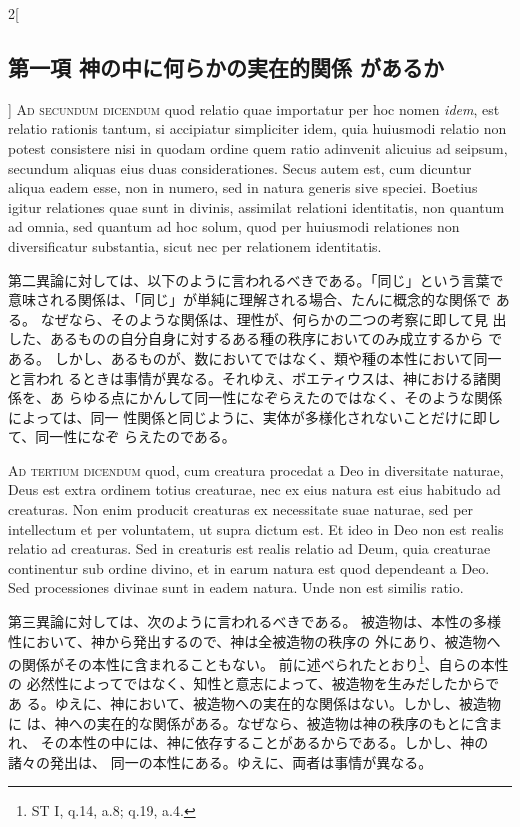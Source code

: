 \documentclass[paper=a4paper,fontsize=10pt,jafontsize=9pt,titlepage]{jlreq}
\begin{document}
\begin{paracol}{2}[\subsection{第一項 神の中に何らかの実在的関係 があるか}]
{\scshape Ad secundum dicendum} quod relatio quae importatur per hoc nomen {\itshape idem},
est relatio rationis tantum, si accipiatur simpliciter idem, quia
huiusmodi relatio non potest consistere nisi in quodam ordine quem ratio
adinvenit alicuius ad seipsum, secundum aliquas eius duas
considerationes. Secus autem est, cum dicuntur aliqua eadem esse, non in
numero, sed in natura generis sive speciei. Boetius igitur relationes
quae sunt in divinis, assimilat relationi identitatis, non quantum ad
omnia, sed quantum ad hoc solum, quod per huiusmodi relationes non
diversificatur substantia, sicut nec per relationem identitatis.


\switchcolumn


第二異論に対しては、以下のように言われるべきである。「同じ」という言葉で
 意味される関係は、「同じ」が単純に理解される場合、たんに概念的な関係で
 ある。
なぜなら、そのような関係は、理性が、何らかの二つの考察に即して見
 出した、あるものの自分自身に対するある種の秩序においてのみ成立するから
 である。
しかし、あるものが、数においてではなく、類や種の本性において同一と言われ
 るときは事情が異なる。それゆえ、ボエティウスは、神における諸関係を、あ
 らゆる点にかんして同一性になぞらえたのではなく、そのような関係によっては、同一
 性関係と同じように、実体が多様化されないことだけに即して、同一性になぞ
 らえたのである。


\switchcolumn*[\subsection{ad.3}]


{\scshape Ad tertium dicendum} quod, cum creatura procedat a Deo in diversitate
naturae, Deus est extra ordinem totius creaturae, nec ex eius natura est
eius habitudo ad creaturas. Non enim producit creaturas ex necessitate
suae naturae, sed per intellectum et per voluntatem, ut supra dictum
est. Et ideo in Deo non est realis relatio ad creaturas. Sed in
creaturis est realis relatio ad Deum, quia creaturae continentur sub
ordine divino, et in earum natura est quod dependeant a Deo. Sed
processiones divinae sunt in eadem natura. Unde non est similis ratio.


\switchcolumn


第三異論に対しては、次のように言われるべきである。
被造物は、本性の多様性において、神から発出するので、神は全被造物の秩序の
 外にあり、被造物への関係がその本性に含まれることもない。
前に述べられたとおり\footnote{ST I, q.14, a.8; q.19, a.4.}、自らの本性の
 必然性によってではなく、知性と意志によって、被造物を生みだしたからであ
 る。ゆえに、神において、被造物への実在的な関係はない。しかし、被造物に
 は、神への実在的な関係がある。なぜなら、被造物は神の秩序のもとに含まれ、
 その本性の中には、神に依存することがあるからである。しかし、神の諸々の発出は、
 同一の本性にある。ゆえに、両者は事情が異なる。



\end{paracol}
\end{document}
